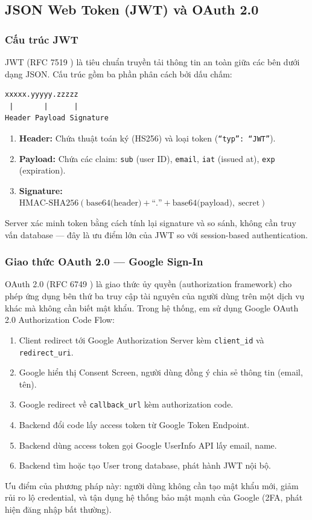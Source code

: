 \subsection{JSON Web Token (JWT) và OAuth 2.0}

\subsubsection{Cấu trúc JWT}

JWT (RFC 7519 \cite{rfc7519jwt}) là tiêu chuẩn truyền tải thông tin an toàn giữa các bên dưới dạng JSON. Cấu trúc gồm ba phần phân cách bởi dấu chấm:

\begin{verbatim}
xxxxx.yyyyy.zzzzz
 |       |      |
Header Payload Signature
\end{verbatim}

\begin{enumerate}
    \item \textbf{Header:} Chứa thuật toán ký (HS256) và loại token (\texttt{``typ'': ``JWT''}).
    \item \textbf{Payload:} Chứa các claim: \texttt{sub} (user ID), \texttt{email}, \texttt{iat} (issued at), \texttt{exp} (expiration).
    \item \textbf{Signature:} $\text{HMAC-SHA256}(\text{base64(header)} + \text{``.''} + \text{base64(payload)}, \; \text{secret})$
\end{enumerate}

Server xác minh token bằng cách tính lại signature và so sánh, không cần truy vấn database --- đây là ưu điểm lớn của JWT so với session-based authentication.

\subsubsection{Giao thức OAuth 2.0 --- Google Sign-In}

OAuth 2.0 (RFC 6749 \cite{rfc6749oauth}) là giao thức ủy quyền (authorization framework) cho phép ứng dụng bên thứ ba truy cập tài nguyên của người dùng trên một dịch vụ khác mà không cần biết mật khẩu. Trong hệ thống, em sử dụng Google OAuth 2.0 Authorization Code Flow:

\begin{enumerate}
    \item Client redirect tới Google Authorization Server kèm \texttt{client\_id} và \texttt{redirect\_uri}.
    \item Google hiển thị Consent Screen, người dùng đồng ý chia sẻ thông tin (email, tên).
    \item Google redirect về \texttt{callback\_url} kèm authorization code.
    \item Backend đổi code lấy access token từ Google Token Endpoint.
    \item Backend dùng access token gọi Google UserInfo API lấy email, name.
    \item Backend tìm hoặc tạo User trong database, phát hành JWT nội bộ.
\end{enumerate}

Ưu điểm của phương pháp này: người dùng không cần tạo mật khẩu mới, giảm rủi ro lộ credential, và tận dụng hệ thống bảo mật mạnh của Google (2FA, phát hiện đăng nhập bất thường).
